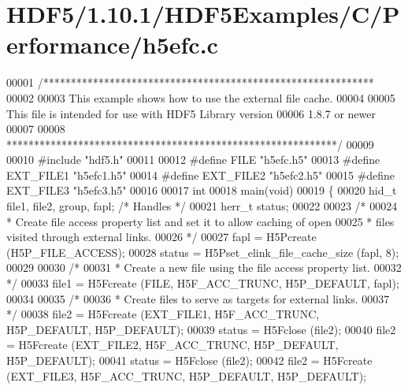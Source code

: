 \hypertarget{_h_d_f5_21_810_81_2_h_d_f5_examples_2_c_2_performance_2h5efc_8c_source}{}\section{H\+D\+F5/1.10.1/\+H\+D\+F5\+Examples/\+C/\+Performance/h5efc.c}
\label{_h_d_f5_21_810_81_2_h_d_f5_examples_2_c_2_performance_2h5efc_8c_source}

\begin{DoxyCode}
00001 \textcolor{comment}{/************************************************************}
00002 \textcolor{comment}{}
00003 \textcolor{comment}{  This example shows how to use the external file cache.}
00004 \textcolor{comment}{}
00005 \textcolor{comment}{  This file is intended for use with HDF5 Library version}
00006 \textcolor{comment}{  1.8.7 or newer}
00007 \textcolor{comment}{}
00008 \textcolor{comment}{ ************************************************************/}
00009 
00010 \textcolor{preprocessor}{#include "hdf5.h"}
00011 
00012 \textcolor{preprocessor}{#define FILE            "h5efc.h5"}
00013 \textcolor{preprocessor}{#define EXT\_FILE1       "h5efc1.h5"}
00014 \textcolor{preprocessor}{#define EXT\_FILE2       "h5efc2.h5"}
00015 \textcolor{preprocessor}{#define EXT\_FILE3       "h5efc3.h5"}
00016 
00017 \textcolor{keywordtype}{int}
00018 main(\textcolor{keywordtype}{void})
00019 \{
00020     hid\_t       file1, file2, group, fapl;      \textcolor{comment}{/* Handles */}
00021     herr\_t      status;
00022 
00023     \textcolor{comment}{/*}
00024 \textcolor{comment}{     * Create file access property list and set it to allow caching of open}
00025 \textcolor{comment}{     * files visited through external links.}
00026 \textcolor{comment}{     */}
00027     fapl = H5Pcreate (H5P\_FILE\_ACCESS);
00028     status = H5Pset\_elink\_file\_cache\_size (fapl, 8);
00029 
00030     \textcolor{comment}{/*}
00031 \textcolor{comment}{     * Create a new file using the file access property list.}
00032 \textcolor{comment}{     */}
00033     file1 = H5Fcreate (FILE, H5F\_ACC\_TRUNC, H5P\_DEFAULT, fapl);
00034 
00035     \textcolor{comment}{/*}
00036 \textcolor{comment}{     * Create files to serve as targets for external links.}
00037 \textcolor{comment}{     */}
00038     file2 = H5Fcreate (EXT\_FILE1, H5F\_ACC\_TRUNC, H5P\_DEFAULT, H5P\_DEFAULT);
00039     status = H5Fclose (file2);
00040     file2 = H5Fcreate (EXT\_FILE2, H5F\_ACC\_TRUNC, H5P\_DEFAULT, H5P\_DEFAULT);
00041     status = H5Fclose (file2);
00042     file2 = H5Fcreate (EXT\_FILE3, H5F\_ACC\_TRUNC, H5P\_DEFAULT, H5P\_DEFAULT);

\end{DoxyCode}
